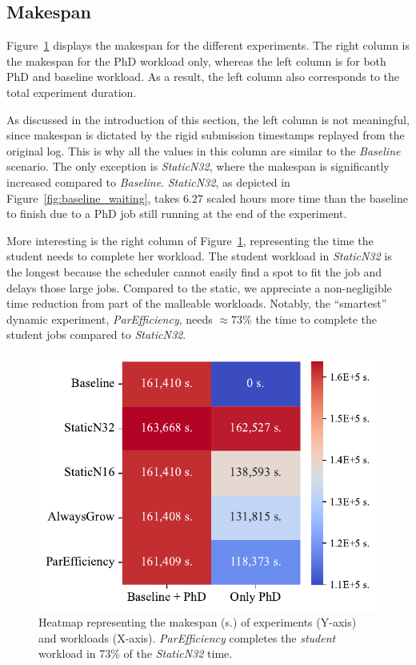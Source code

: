 \documentclass[a4paper,fleqn]{cas-dc}
\begin{document}
\subsection{Makespan}\label{subsec:makespan}
Figure~\ref{fig:heatmap} displays the makespan for the different experiments.
The right column is the makespan for the PhD workload only,
whereas the left column is for both PhD and baseline workload.
As a result, the left column also corresponds to the total experiment duration.

As discussed in the introduction of this section, the left column is not meaningful, since makespan is dictated by the rigid submission timestamps replayed from the original log.
This is why all the values in this column are similar to the \textit{Baseline} scenario.
The only exception is \textit{StaticN32}, where the makespan is significantly increased compared to \textit{Baseline}.
\textit{StaticN32}, as depicted in Figure~\ref{fig:baseline_waiting}, takes $6.27$ scaled hours more time than the baseline to finish
due to a PhD job still running at the end of the experiment.

More interesting is the right column of Figure~\ref{fig:heatmap}, representing the time the student needs to complete her workload.
The student workload in \textit{StaticN32} is the longest because the scheduler cannot easily find a spot to fit the job and delays those large jobs.
Compared to the static, we appreciate a non-negligible time reduction from part of the malleable workloads.
Notably, the ``smartest'' dynamic experiment, \textit{ParEfficiency}, needs $\approx73\%$ the time to complete the student jobs compared to \textit{StaticN32}.

\begin{figure}[tbp]
    \centering
    \includegraphics[clip,width=0.6\linewidth,trim={0.1cm 0.1cm 0.1cm 0.1cm}]{figures/heatmap.pdf}
    \caption{Heatmap representing the makespan (s.) of experiments (Y-axis) and workloads (X-axis). \textit{ParEfficiency} completes the \textit{student} workload in 73\% of the \textit{StaticN32} time.}
    \label{fig:heatmap}
\end{figure}
\end{document}
